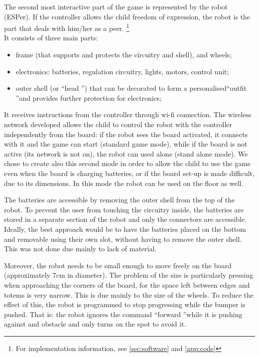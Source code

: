 \documentclass[a4paper,twoside]{book}
\begin{document}
The second most interactive part of the game is represented by the robot (ESPer). If the controller allows the child freedom of expression, the robot is the part that deals with him/her as a peer. 
\footnote{For implementation information, see \autoref{sec:software} and \autoref{app:code} }
\\
It consists of three main parts:
\begin{itemize}
\item frame (that supports and protects the circuitry and shell), and wheels;
\item electronics: batteries, regulation circuitry, lights, motors, control unit;
\item outer shell (or \textquotedblleft head \textquotedblright) that can be decorated to form a personalised\textquotedblleft outfit \textquotedblright and provides further protection for electronics;
\end{itemize}

It receives instructions from the controller through wi-fi connection. The wireless network developed allows the child to control the robot with the controller independently from the board: if the robot sees the board activated, it connects with it and the game can start (standard game mode), while if the board is not active (its network is not on), the robot can used alone (stand alone mode). We chose to create also this second mode in order to allow the child to use the game even when the board is charging batteries, or if the board set-up is made difficult, due to its dimensions. In this mode the robot can be used on the floor as well.

The batteries are accessible by removing the outer shell from the top of the robot. To prevent the user from touching the circuitry inside, the batteries are stored in a separate section of the robot and only the connectors are accessible.
Ideally, the best approach would be to have the batteries placed on the bottom and removable using their own slot, without having to remove the outer shell. This was not done due mainly to lack of material.

Moreover, the robot needs to be small enough to move freely on the board (approximately 7cm in diameter). The problem of the size is particularly pressing when approaching the corners of the board, for the space left between edges and totems is very narrow. This is due mainly to the size of the wheels. To reduce the effect of this, the robot is programmed to stop progressing while the bumper is pushed. That is: the robot ignores the command \textquotedblleft forward \textquotedblright while it is pushing against and obstacle and only turns on the spot to avoid it.
\end{document}
